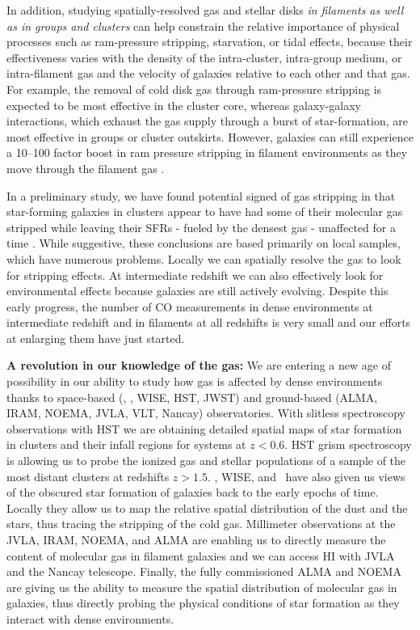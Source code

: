 \documentclass[11pt]{article}
\begin{document}
In addition, studying spatially-resolved gas and stellar disks {\em in filaments as well as in groups and clusters} can help constrain the relative importance
of physical processes such as ram-pressure stripping, starvation, or tidal effects, because their effectiveness varies with
the density of the intra-cluster, intra-group medium, or intra-filament gas and the
velocity of galaxies relative to each other and that gas.  For example, the removal of cold disk gas through
ram-pressure stripping is expected to be most effective in the cluster
core, whereas galaxy-galaxy interactions, which exhaust the gas supply
through a burst of star-formation, are most effective in groups or
cluster outskirts.  However, galaxies can still experience a 10--100 factor boost in ram pressure stripping in filament environments as they move through the filament gas \citep{Bahe13}.

In a preliminary study, we have found potential signed of gas stripping in that star-forming galaxies in
clusters appear to have had some of their molecular gas stripped while
leaving their SFRs - fueled by the densest gas - unaffected for a time
\citep{Jablonka13}.  While suggestive, these conclusions are based
primarily on local samples, which have numerous problems.  Locally we can spatially resolve the gas to look for stripping effects.  At intermediate redshift we can also effectively look for environmental effects
because galaxies are still actively evolving.  Despite this early progress, the number of
CO measurements in dense environments at intermediate redshift and in filaments at all redshifts is very small and our efforts at
enlarging them have just started.  

\textbf{A revolution in our knowledge of the gas:} We are entering a
new age of possibility in our ability to study how gas is affected by
dense environments thanks to space-based (\spitzer, \herschel, WISE, HST,
JWST) and ground-based (ALMA, IRAM, NOEMA, JVLA, VLT, Nancay)
observatories.  With slitless spectroscopy
observations with HST we are obtaining detailed spatial
maps of star formation in clusters and their infall regions for
systems at $z<0.6$.  HST grism spectroscopy is allowing us to probe
the ionized gas and stellar populations of a sample of the most
distant clusters at redshifts $z>1.5$.  \spitzer, WISE, and \herschel\ have
also given us views of the obscured star formation of galaxies back to
the early epochs of time.  Locally they allow us to map the relative
spatial distribution of the dust and the stars, thus tracing the
stripping of the cold gas.  Millimeter observations at the JVLA, IRAM, NOEMA,
and ALMA are enabling us to directly measure the content of molecular
gas in filament galaxies and we can access HI with JVLA and the Nancay telescope.  Finally, the fully commissioned ALMA and NOEMA are giving us
the ability to measure the spatial distribution of molecular gas in
galaxies, thus directly probing the physical conditions of star
formation as they interact with dense environments.
\end{document}
